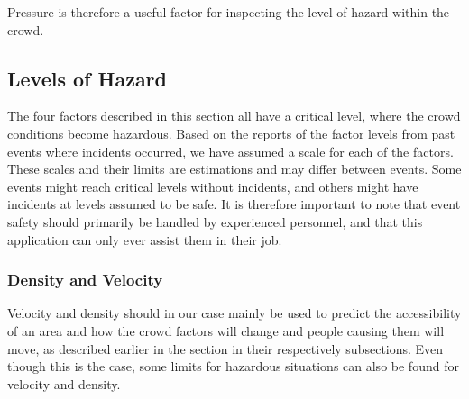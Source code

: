 Pressure is therefore a useful factor for inspecting the level of hazard within the crowd.


\subsection{Levels of Hazard}
\label{subsec:levelsOfHazard}
The four factors described in this section all have a critical level, where the crowd conditions become hazardous. Based on the reports of the factor levels from past events where incidents occurred, we have assumed a scale for each of the factors. These scales and their limits are estimations and may differ between events. Some events might reach critical levels without incidents, and others might have incidents at levels assumed to be safe. It is therefore important to note that event safety should primarily be handled by experienced personnel, and that this application can only ever assist them in their job.


\subsubsection{Density and Velocity}
Velocity and density should in our case mainly be used to predict the accessibility of an area and how the crowd factors will change and people causing them will move, as described earlier in the section in their respectively subsections. Even though this is the case, some limits for hazardous situations can also be found for velocity and density.

